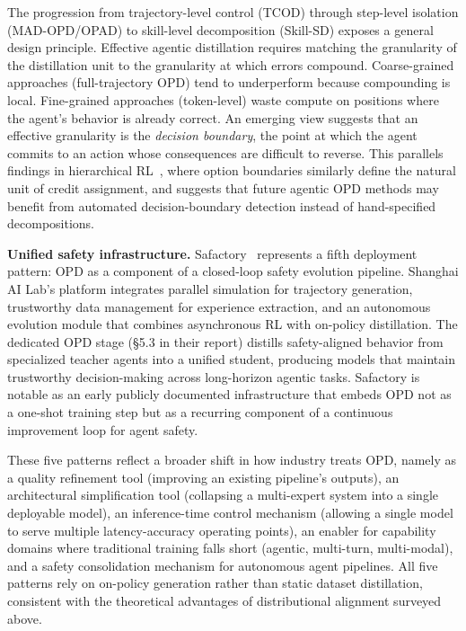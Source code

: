 \documentclass{article} %
\begin{document}
The progression from trajectory-level control (TCOD) through step-level isolation (MAD-OPD/OPAD) to skill-level decomposition (Skill-SD) exposes a general design principle. Effective agentic distillation requires matching the granularity of the distillation unit to the granularity at which errors compound. Coarse-grained approaches (full-trajectory OPD) tend to underperform because compounding is local. Fine-grained approaches (token-level) waste compute on positions where the agent's behavior is already correct. An emerging view suggests that an effective granularity is the \emph{decision boundary}, the point at which the agent commits to an action whose consequences are difficult to reverse. This parallels findings in hierarchical RL~\citep{1011.0686}, where option boundaries similarly define the natural unit of credit assignment, and suggests that future agentic OPD methods may benefit from automated decision-boundary detection instead of hand-specified decompositions.

\textbf{Unified safety infrastructure.} Safactory~\citep{2605.06230} represents a fifth deployment pattern: OPD as a component of a closed-loop safety evolution pipeline. Shanghai AI Lab's platform integrates parallel simulation for trajectory generation, trustworthy data management for experience extraction, and an autonomous evolution module that combines asynchronous RL with on-policy distillation. The dedicated OPD stage (\S5.3 in their report) distills safety-aligned behavior from specialized teacher agents into a unified student, producing models that maintain trustworthy decision-making across long-horizon agentic tasks. Safactory is notable as an early publicly documented infrastructure that embeds OPD not as a one-shot training step but as a recurring component of a continuous improvement loop for agent safety.

These five patterns reflect a broader shift in how industry treats OPD, namely as a quality refinement tool (improving an existing pipeline's outputs), an architectural simplification tool (collapsing a multi-expert system into a single deployable model), an inference-time control mechanism (allowing a single model to serve multiple latency-accuracy operating points), an enabler for capability domains where traditional training falls short (agentic, multi-turn, multi-modal), and a safety consolidation mechanism for autonomous agent pipelines. All five patterns rely on on-policy generation rather than static dataset distillation, consistent with the theoretical advantages of distributional alignment surveyed above.
\end{document}
